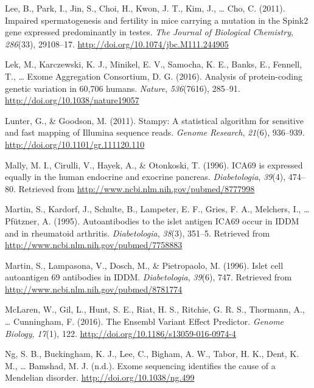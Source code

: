 \documentclass[12pt,twoside]{reedthesis}
\theoremstyle{definition}
\theoremstyle{definition}
\theoremstyle{remark}
\begin{document}
  \hypertarget{ref-Lee2011}{}
  Lee, B., Park, I., Jin, S., Choi, H., Kwon, J. T., Kim, J., \ldots{}
  Cho, C. (2011). Impaired spermatogenesis and fertility in mice carrying
  a mutation in the Spink2 gene expressed predominantly in testes.
  \emph{The Journal of Biological Chemistry}, \emph{286}(33), 29108--17.
  \url{http://doi.org/10.1074/jbc.M111.244905}
  
  \hypertarget{ref-Lek2016}{}
  Lek, M., Karczewski, K. J., Minikel, E. V., Samocha, K. E., Banks, E.,
  Fennell, T., \ldots{} Exome Aggregation Consortium, D. G. (2016).
  Analysis of protein-coding genetic variation in 60,706 humans.
  \emph{Nature}, \emph{536}(7616), 285--91.
  \url{http://doi.org/10.1038/nature19057}
  
  \hypertarget{ref-Lunter2011}{}
  Lunter, G., \& Goodson, M. (2011). Stampy: A statistical algorithm for
  sensitive and fast mapping of Illumina sequence reads. \emph{Genome
  Research}, \emph{21}(6), 936--939.
  \url{http://doi.org/10.1101/gr.111120.110}
  
  \hypertarget{ref-Mally1996}{}
  Mally, M. I., Cirulli, V., Hayek, A., \& Otonkoski, T. (1996). ICA69 is
  expressed equally in the human endocrine and exocrine pancreas.
  \emph{Diabetologia}, \emph{39}(4), 474--80. Retrieved from
  \url{http://www.ncbi.nlm.nih.gov/pubmed/8777998}
  
  \hypertarget{ref-Martin1995}{}
  Martin, S., Kardorf, J., Schulte, B., Lampeter, E. F., Gries, F. A.,
  Melchers, I., \ldots{} Pfützner, A. (1995). Autoantibodies to the islet
  antigen ICA69 occur in IDDM and in rheumatoid arthritis.
  \emph{Diabetologia}, \emph{38}(3), 351--5. Retrieved from
  \url{http://www.ncbi.nlm.nih.gov/pubmed/7758883}
  
  \hypertarget{ref-Martin1996}{}
  Martin, S., Lampasona, V., Dosch, M., \& Pietropaolo, M. (1996). Islet
  cell autoantigen 69 antibodies in IDDM. \emph{Diabetologia},
  \emph{39}(6), 747. Retrieved from
  \url{http://www.ncbi.nlm.nih.gov/pubmed/8781774}
  
  \hypertarget{ref-McLaren2016}{}
  McLaren, W., Gil, L., Hunt, S. E., Riat, H. S., Ritchie, G. R. S.,
  Thormann, A., \ldots{} Cunningham, F. (2016). The Ensembl Variant Effect
  Predictor. \emph{Genome Biology}, \emph{17}(1), 122.
  \url{http://doi.org/10.1186/s13059-016-0974-4}
  
  \hypertarget{ref-Ng}{}
  Ng, S. B., Buckingham, K. J., Lee, C., Bigham, A. W., Tabor, H. K.,
  Dent, K. M., \ldots{} Bamshad, M. J. (n.d.). Exome sequencing identifies
  the cause of a Mendelian disorder. \url{http://doi.org/10.1038/ng.499}
  
\end{document}
